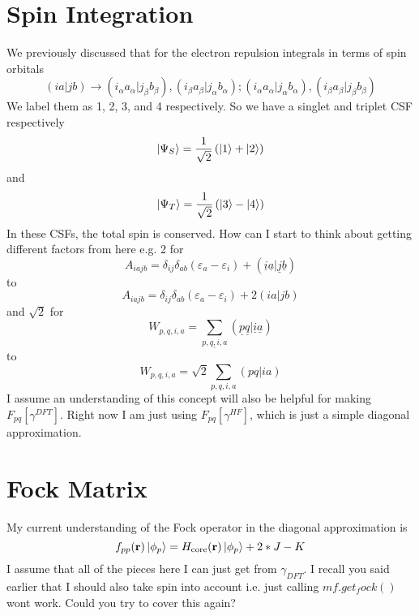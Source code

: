 \documentclass[12pt]{article}
\begin{document}
\section{Spin Integration}
We previously discussed that for the electron repulsion integrals in terms of spin orbitals
\begin{equation}
    (ia|jb) \rightarrow (i_{\alpha }a_{\alpha }|j_{\beta }b_{\beta }) , (i_{\beta }a_{\beta }|j_{\alpha }b_{\alpha }); (i_{\alpha }a_{\alpha }|j_{\alpha }b_{\alpha }) , (i_{\beta }a_{\beta }|j_{\beta }b_{\beta })
\end{equation}
We label them as 1, 2, 3, and 4 respectively. 
So we have a singlet and triplet CSF respectively
\begin{equation}
    \ket{\Psi _{S}} = \frac{1}{\sqrt{2}} \left(\ket{1}+\ket{2}\right)
\end{equation}
and
\begin{equation}
    \ket{\Psi _{T}} = \frac{1}{\sqrt{2}} \left(\ket{3}-\ket{4}\right)
\end{equation}
In these CSFs, the total spin is conserved.
How can I start to think about getting different factors from here e.g. 2 for
\begin{equation}
    A_{iajb}=\delta _{ij} \delta _{ab} \left(\varepsilon _{a}-\varepsilon _{i}\right) + (\underline{i} \underline{a} | \underline{j} \underline{b} )
\end{equation}
to
\begin{equation}
    A_{iajb}=\delta _{ij} \delta _{ab} \left(\varepsilon _{a}-\varepsilon _{i}\right) + 2(ia|jb)
\end{equation}
and $\sqrt{2}$ for 
\begin{equation}
    W_{p,q,i,a} = \sum_{\underline{p,q,i,a}} (\underline{p} \underline{q} | \underline{i} \underline{a} )
\end{equation}
to
\begin{equation}
    W_{p,q,i,a} = \sqrt{2} \sum_{p,q,i,a} (pq|ia)
\end{equation}
I assume an understanding of this concept will also be helpful for making $F_{pq}[\gamma^{DFT}]$. Right now I am just using $F_{pq}[\gamma^{HF}]$, which is just a simple diagonal approximation.
\section{Fock Matrix}
My current understanding of the Fock operator in the diagonal approximation is
\begin{equation}
    f_{pp}(\textbf{r})\ket{\phi _{p}} = H_{\text{core}}(\textbf{r})\ket{\phi _{p}} + 2*J - K
\end{equation}
I assume that all of the pieces here I can just get from $\gamma _{DFT}$.
I recall you said earlier that I should also take spin into account i.e. just calling $mf.get_fock()$ wont work. Could you try to cover this again?
\end{document}
